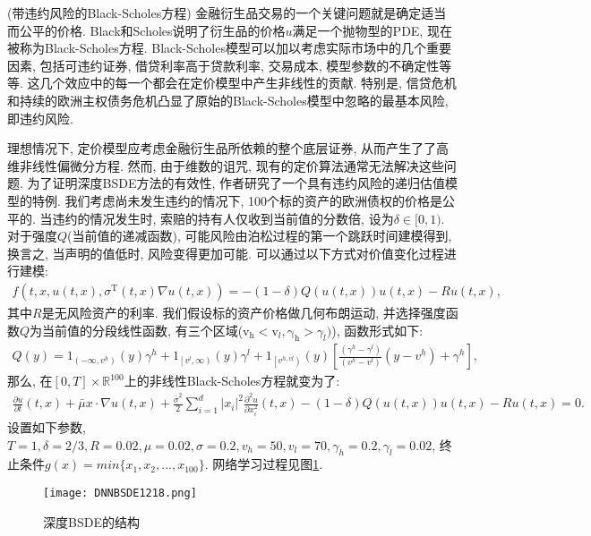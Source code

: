 \begin{example}
(带违约风险的Black-Scholes方程)
 金融衍生品交易的一个关键问题就是确定适当而公平的价格. Black和Scholes说明了衍生品的价格$u$满足一个抛物型的PDE, 现在被称为Black-Scholes方程. Black-Scholes模型可以加以考虑实际市场中的几个重要因素, 包括可违约证券, 借贷利率高于贷款利率, 交易成本, 模型参数的不确定性等等. 这几个效应中的每一个都会在定价模型中产生非线性的贡献. 特别是, 信贷危机和持续的欧洲主权债务危机凸显了原始的Black-Scholes模型中忽略的最基本风险, 即违约风险.

理想情况下, 定价模型应考虑金融衍生品所依赖的整个底层证券, 从而产生了了高维非线性偏微分方程. 然而, 由于维数的诅咒, 现有的定价算法通常无法解决这些问题. 为了证明深度BSDE方法的有效性, 作者研究了一个具有违约风险的递归估值模型的特例.
我们考虑尚未发生违约的情况下, 100个标的资产的欧洲债权的价格是公平的. 当违约的情况发生时, 索赔的持有人仅收到当前值的分数倍, 设为$\delta\in [0, 1)$.
对于强度$Q$(当前值的递减函数), 可能风险由泊松过程的第一个跳跃时间建模得到, 换言之, 当声明的值低时, 风险变得更加可能. 可以通过以下方式对价值变化过程进行建模:
\begin{align}
  f\left(t,  x,  u(t,  x),  \sigma^{\mathrm{T}}(t,  x) \nabla u(t,  x)\right)=-(1-\delta) Q(u(t,  x)) u(t,  x)-R u(t,  x),
\end{align}
其中$R$是无风险资产的利率.  我们假设标的资产价格做几何布朗运动, 并选择强度函数$Q$为当前值的分段线性函数, 有三个区域($\mathrm{v_h}<\mathrm{v}_l,  \mathrm{\gamma_h}>\gamma_l)$), 函数形式如下:
\begin{align}
  Q(y)=1_{\left(-\infty,  v^{h}\right)}(y) \gamma^{h}+1_{\left[v^{l},  \infty\right)}(y) \gamma^{l}+1_{\left[v^{h,  v l}\right)}(y)\left[\frac{\left(\gamma^{h}-\gamma^{l}\right)}{\left(v^{h}-v^{l}\right)}\left(y-v^{h}\right)+\gamma^{h}\right],
\end{align}
那么, 在$[0, T]\times \mathbb R^{100}$上的非线性Black-Scholes方程就变为了:
\begin{align}
  \frac{\partial u}{\partial t}(t,  x)+\bar{\mu} x \cdot \nabla u(t,  x)+\frac{\bar{\sigma}^{2}}{2} \sum_{i=1}^{d}\left|x_{i}\right|^{2}
       \frac{\partial^{2} u}{\partial x_{i}^{2}}(t,  x)-(1-\delta) Q(u(t,  x)) u(t,  x)-R u(t,  x)=0.
\end{align}
设置如下参数, $T=1, \delta=2/3, R=0.02, \mu=0.02, \sigma=0.2, v_h=50, v_l=70, \gamma_h=0.2, \gamma_l=0.02$, 终止条件$g(x)=min\{x_1, x_2, ..., x_{100}\}$. 网络学习过程见图\ref{DNNBSDE1218Fig4}.
\end{example}
\begin{figure}[htbp]
	\centering
	\texttt{[image: DNNBSDE1218.png]}
	\caption{深度BSDE的结构}
   \label{DNNBSDE1218Fig4}
\end{figure}
